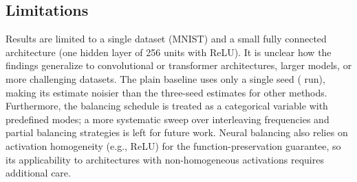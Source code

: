 \subsection{Limitations}
Results are limited to a single dataset (MNIST) and a small fully connected architecture (one hidden layer of 256 units with ReLU). It is unclear how the findings generalize to convolutional or transformer architectures, larger models, or more challenging datasets. The plain baseline uses only a single seed (\RegMnistPlainSeedCount{} run), making its estimate noisier than the three-seed estimates for other methods. Furthermore, the balancing schedule is treated as a categorical variable with predefined modes; a more systematic sweep over interleaving frequencies and partial balancing strategies is left for future work. Neural balancing also relies on activation homogeneity (e.g., ReLU) for the function-preservation guarantee, so its applicability to architectures with non-homogeneous activations requires additional care.

